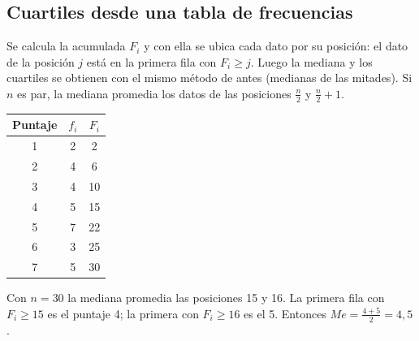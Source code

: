 \subsection{Cuartiles desde una tabla de frecuencias}
Se calcula la acumulada $F_i$ y con ella se ubica cada dato por su posición: el dato de la posición $j$ está en la primera fila con $F_i \ge j$. Luego la mediana y los cuartiles se obtienen con el mismo método de antes (medianas de las mitades). Si $n$ es par, la mediana promedia los datos de las posiciones $\frac{n}{2}$ y $\frac{n}{2}+1$.

\begin{minipage}[t]{0.36\linewidth}\vspace{0pt}\centering\small
\begin{tabular}{@{}ccc@{}}\toprule
Puntaje & $f_i$ & $F_i$\\\midrule
1 & 2 & 2\\ 2 & 4 & 6\\ 3 & 4 & 10\\ 4 & 5 & 15\\ 5 & 7 & 22\\ 6 & 3 & 25\\ 7 & 5 & 30\\\bottomrule
\end{tabular}
\end{minipage}\hfill
\begin{minipage}[t]{0.6\linewidth}\vspace{0pt}
\begin{ejemplo} Con $n = 30$ la mediana promedia las posiciones 15 y 16. La primera fila con $F_i \ge 15$ es el puntaje 4; la primera con $F_i \ge 16$ es el 5. Entonces $Me = \frac{4+5}{2} = 4{,}5$.\end{ejemplo}
\end{minipage}


